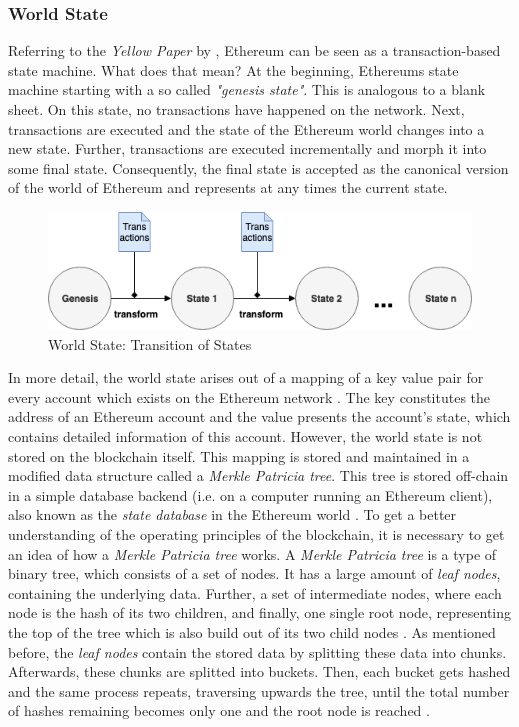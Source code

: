 \subsubsection{World State}
\label{sec:world_state}
Referring to the \textit{Yellow Paper} by , Ethereum can be seen as a transaction-based state machine. What does that mean? At the beginning, Ethereums state machine starting with a so called \textit{"genesis state"}. This is analogous to a blank sheet. On this state, no transactions have happened on the network. Next, transactions are executed and the state of the Ethereum world changes into a new state. Further, transactions are executed incrementally and morph it into some final state. Consequently, the final state is accepted as the canonical version of the world of Ethereum and represents at any times the current state.

\begin{figure}[htbp]
	\centering
	\includegraphics[width=.9\linewidth]{./figures/state_transition.png}
	\caption{World State: Transition of States}
	\label{figure:state_transition}
\end{figure}

In more detail, the world state arises out of a mapping of a key value pair for every account which exists on the Ethereum network . The key constitutes the address of an Ethereum account and the value presents the account's state, which contains detailed information of this account. 
However, the world state is not stored on the blockchain itself. This mapping is stored and maintained in a modified data structure called a \textit{Merkle Patricia tree}. This tree is stored off-chain in a simple database backend (i.e. on a computer running an Ethereum client), also known as the \textit{state database} in the Ethereum world . To get a better understanding of the operating principles of the blockchain, it is necessary to get an idea of how a \textit{Merkle Patricia tree} works. A \textit{Merkle Patricia tree} is a type of binary tree, which consists of a set of nodes. It has a large amount of 
\textit{leaf nodes}, containing the underlying data. Further, a set of intermediate nodes, where each node is the hash of its two children, and finally, one single root node, representing the top of the tree which is also build out of its two child nodes  .
As mentioned before, the \textit{leaf nodes} contain the stored data by splitting these data into chunks. Afterwards, these chunks are splitted into buckets. Then, each bucket gets hashed and the same process repeats, traversing upwards the tree, until the total number of hashes remaining becomes only one and the root node is reached . 

